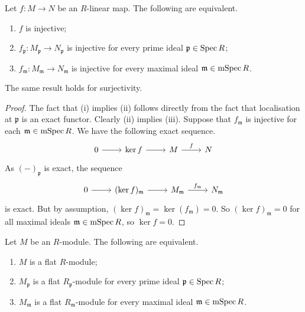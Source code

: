 \begin{proposition}
    Let \( f : M \to N \) be an \( R \)-linear map.
    The following are equivalent.
    \begin{enumerate}
        \item \( f \) is injective;
        \item \( f_{\mathfrak p} : M_{\mathfrak p} \to N_{\mathfrak p} \) is injective for every prime ideal \( \mathfrak p \in \operatorname{Spec} R \);
        \item \( f_{\mathfrak m} : M_{\mathfrak m} \to N_{\mathfrak m} \) is injective for every maximal ideal \( \mathfrak m \in \operatorname{mSpec} R \).
    \end{enumerate}
\end{proposition}
The same result holds for surjectivity.
\begin{proof}
    The fact that (i) implies (ii) follows directly from the fact that localisation at \( \mathfrak p \) is an exact functor.
    Clearly (ii) implies (iii).
    Suppose that \( f_{\mathfrak m} \) is injective for each \( \mathfrak m \in \operatorname{mSpec} R \).
    We have the following exact sequence.
\[\begin{tikzcd}
	0 & {\ker f} & M & N
	\arrow[from=1-1, to=1-2]
	\arrow[from=1-2, to=1-3]
	\arrow["f", from=1-3, to=1-4]
\end{tikzcd}\]
    As \( (-)_{\mathfrak p} \) is exact, the sequence
\[\begin{tikzcd}
	0 & {(\ker f)_{\mathfrak m}} & {M_{\mathfrak m}} & {N_{\mathfrak m}}
	\arrow[from=1-1, to=1-2]
	\arrow[from=1-2, to=1-3]
	\arrow["{f_{\mathfrak m}}", from=1-3, to=1-4]
\end{tikzcd}\]
    is exact.
    But by assumption, \( (\ker f)_{\mathfrak m} = \ker (f_{\mathfrak m}) = 0 \).
    So \( (\ker f)_{\mathfrak m} = 0 \) for all maximal ideals \( \mathfrak m \in \operatorname{mSpec} R \), so \( \ker f = 0 \).
\end{proof}
\begin{proposition}
    Let \( M \) be an \( R \)-module.
    The following are equivalent.
    \begin{enumerate}
        \item \( M \) is a flat \( R \)-module;
        \item \( M_{\mathfrak p} \) is a flat \( R_{\mathfrak p} \)-module for every prime ideal \( \mathfrak p \in \operatorname{Spec} R \);
        \item \( M_{\mathfrak m} \) is a flat \( R_{\mathfrak m} \)-module for every maximal ideal \( \mathfrak m \in \operatorname{mSpec} R \).
    \end{enumerate}
\end{proposition}
